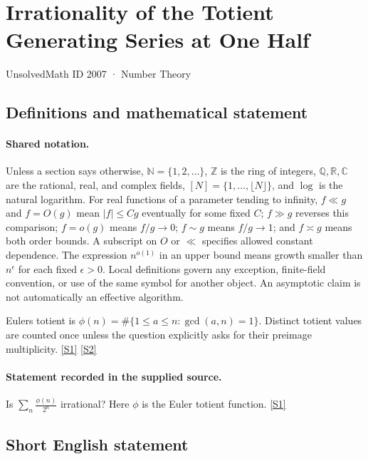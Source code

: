 \documentclass[11pt,a4paper]{article}
\newcommand{\N}{\mathbb{N}}
\newcommand{\Z}{\mathbb{Z}}
\newcommand{\Q}{\mathbb{Q}}
\newcommand{\R}{\mathbb{R}}
\newcommand{\C}{\mathbb{C}}
\newcommand{\sref}[2]{\hyperlink{source:#1:#2}{[S#2]}}
\begin{document}

\setcounter{section}{2006}

\section{Irrationality of the Totient Generating Series at One Half}\label{2007}

{\small\sffamily UnsolvedMath ID 2007 · Number Theory}

\subsection{Definitions and mathematical statement}

\paragraph{Shared notation.}Unless a section says otherwise, $\N=\{1,2,\ldots\}$,
$\Z$ is the ring of integers, $\Q,\R,\C$ are the rational, real, and complex
fields, $[N]=\{1,\ldots,\lfloor N\rfloor\}$, and $\log$ is the natural
logarithm. For real functions of a parameter tending to infinity,
$f\ll g$ and $f=O(g)$ mean $|f|\leq Cg$ eventually for some fixed $C$;
$f\gg g$ reverses this comparison; $f=o(g)$ means $f/g\to0$;
$f\sim g$ means $f/g\to1$; and $f\asymp g$ means both order bounds.
A subscript on $O$ or $\ll$ specifies allowed constant dependence.
The expression $n^{o(1)}$ in an upper bound means growth smaller than
$n^\epsilon$ for each fixed $\epsilon>0$. Local definitions govern any
exception, finite-field convention, or use of the same symbol for another
object. An asymptotic claim is not automatically an effective algorithm.



Euler\textquotesingle s totient is $\phi(n)=\#\{1\leq a\leq n:\gcd(a,n)=1\}$. Distinct totient values are counted once unless the question explicitly asks for their preimage multiplicity. \sref{2007}{1} \sref{2007}{2}

\paragraph{Statement recorded in the supplied source.}
Is $ \sum_n \frac{\phi(n)}{2^n} $ irrational? Here $\phi$ is the Euler totient function. \sref{2007}{1}

\subsection{Short English statement}
\end{document}
